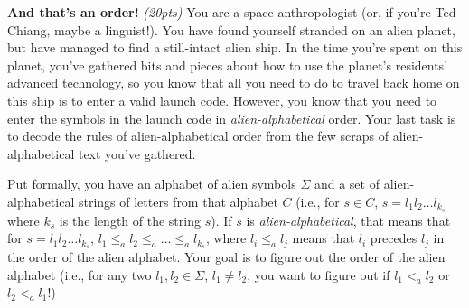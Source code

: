 \documentclass{exam}
\begin{document}
\begin{questions}

    \question \textbf{And that's an order!} \textit{(20pts)}
    You are a space anthropologist (or, if you're Ted Chiang, maybe a linguist!). You have found yourself stranded on an alien planet, but have managed to find a still-intact alien ship. In the time you're spent on this planet, you've gathered bits and pieces about how to use the planet's residents' advanced technology, so you know that all you need to do to travel back home on this ship is to enter a valid launch code. However, you know that you need to enter the symbols in the launch code in \textit{alien-alphabetical} order. Your last task is to decode the rules of alien-alphabetical order from the few scraps of alien-alphabetical text you've gathered.

    Put formally, you have an alphabet of alien symbols $\Sigma$ and a set of alien-alphabetical strings of letters from that alphabet $C$ (i.e., for $s\in C$, $s = l_1l_2\dots l_{k_s}$ where $k_s$ is the length of the string $s$). If $s$ is \textit{alien-alphabetical}, that means that for $s = l_1l_2\dots l_{k_s}$, $l_1 \leq_a l_2 \leq_a \dots \leq_a l_{k_s}$, where $l_i \leq_a l_j$ means that $l_i$ precedes $l_j$ in the order of the alien alphabet. Your goal is to figure out the order of the alien alphabet (i.e., for any two $l_1, l_2 \in \Sigma$, $l_1 \neq l_2$, you want to figure out if $l_1 <_a l_2$ or $l_2 <_a l_1$!)


\end{questions}
\end{document}
